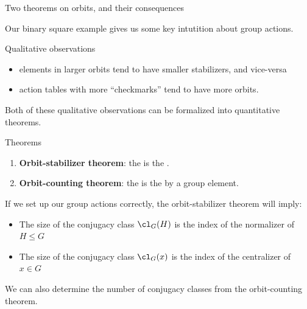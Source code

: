 \documentclass[8pt, handout]{beamer}
\newcommand{\Pause}{}      %
\begin{document}
\begin{frame}{Two theorems on orbits, and their consequences} %
  
  Our binary square example gives us some key intutition about group actions.
  
  \smallskip\Pause
  
  \begin{exampleblock}{Qualitative observations}
    \begin{itemize}
    \item elements in larger orbits tend to have smaller
      stabilizers, and vice-versa \Pause
    \item action tables with more ``checkmarks'' tend to have more orbits.
    \end{itemize}
  \end{exampleblock}
  
  \smallskip\Pause
  
  Both of these qualitative observations can be formalized
  into quantitative theorems.
  
  \smallskip\Pause
  
  \begin{alertblock}{Theorems}
    \begin{enumerate}
    \item \textbf{Orbit-stabilizer theorem}: the  is the
      . \Pause
    \item \textbf{Orbit-counting theorem}: the  is the
       by a group element.
    \end{enumerate}
  \end{alertblock}
  
  \smallskip\Pause
  
  If we set up our group actions correctly, the orbit-stabilizer theorem
  will imply:
  
  \begin{itemize}
  \item The size of the conjugacy class $\cl_G(H)$ is the index of
    the normalizer of $H\leq G$   \smallskip\Pause
  \item The size of the conjugacy class $\cl_G(x)$ is the index of
    the centralizer of $x\in G$
  \end{itemize}
  
  \smallskip\Pause
  
  We can also determine the number of conjugacy classes from the
  orbit-counting theorem.
  
\end{frame}
\end{document}
